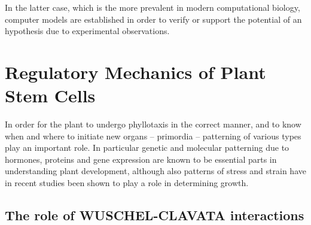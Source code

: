 In the latter case, which is the more prevalent in modern computational biology,
computer models are established in order to verify or support the potential of
an hypothesis due to experimental observations. \CITE



\section{Regulatory Mechanics of Plant Stem Cells} %
In order for the plant to undergo phyllotaxis in the correct manner, and to know
when and where to initiate new organs -- primordia -- patterning of various
types play an important role. In particular genetic and molecular patterning due
to hormones, proteins and gene expression are known to be essential parts in understanding
plant development, although also patterns of stress and strain have in recent
studies been shown to play a role in determining growth. \CITE 










\subsection{The role of WUSCHEL-CLAVATA interactions} %



